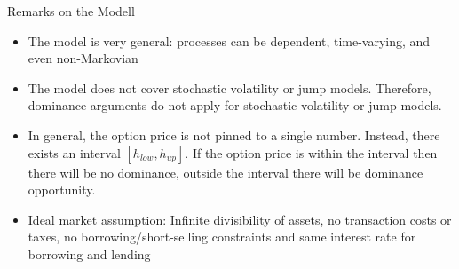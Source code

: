 \documentclass{beamer}
\begin{document}
\begin{frame}{Remarks on the Modell}

    {\footnotesize \footnotesize
    \begin{itemize}
        \item The model is very general: processes can be dependent, time-varying, and even non-Markovian
        \vspace{1em}
        \item The model does not cover stochastic volatility or jump models. 
        Therefore, dominance arguments do not apply for stochastic volatility or jump models.
        \vspace{1em}
        \item  \pause In general, the option price is not pinned to a single number. Instead, there exists an interval $[h_{low},h_{up}]$.
        If the option price is within the interval then there will be no dominance, outside the interval there will be dominance opportunity.
        \vspace{1em}
        \item Ideal market assumption: Infinite divisibility of assets, no transaction costs or taxes, no borrowing/short-selling constraints 
        and same interest rate for borrowing and lending
    \end{itemize}
    }   
\end{frame}
\end{document}
